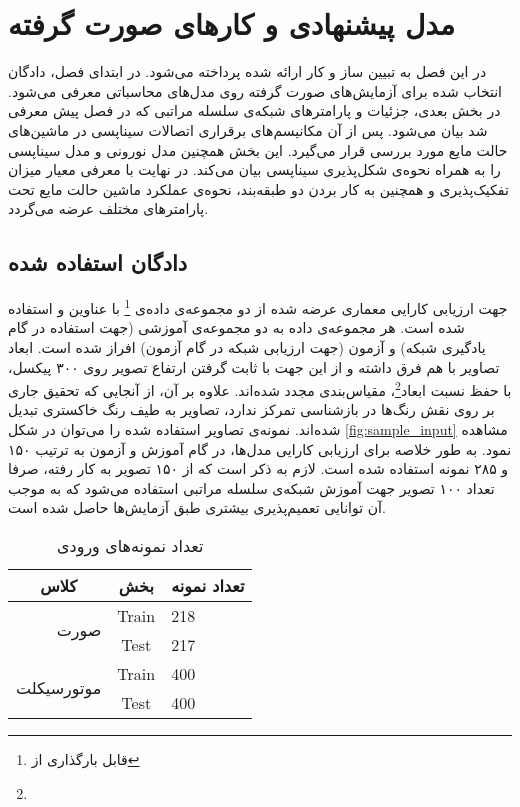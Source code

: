 \chapter{مدل پیشنهادی و کار‌های صورت گرفته}
در این فصل به تبیین ساز و کار ارائه شده پرداخته می‌شود. در ابتدای فصل، دادگان انتخاب شده برای آزمایش‌های صورت گرفته روی مدل‌های محاسباتی معرفی می‌شود. در بخش بعدی، جزئیات و پارامترهای شبکه‌ی سلسله مراتبی که در فصل پیش معرفی شد بیان می‌شود. پس از آن مکانیسم‌های برقراری اتصالات سیناپسی در ماشین‌های حالت مایع مورد بررسی قرار می‌گیرد. این بخش همچنین مدل نورونی و مدل سیناپسی را به همراه نحوه‌ی شکل‌پذیری سیناپسی بیان می‌کند. در نهایت با معرفی معیار میزان تفکیک‌پذیری و همچنین به کار بردن دو طبقه‌بند، نحوه‌ی عملکرد ماشین حالت مایع تحت پارامترهای مختلف عرضه می‌گردد.
\section{دادگان استفاده شده}
جهت ارزیابی کارایی معماری عرضه شده از دو مجموعه‌ی داده‌ی \footnote{قابل بارگذاری از } با عناوین  و  استفاده شده است. هر مجموعه‌ی داده به دو مجموعه‌ی آموزشی (جهت استفاده در گام یادگیری شبکه) و آزمون (جهت ارزیابی شبکه در گام آزمون) افراز شده است. ابعاد تصاویر با هم فرق داشته و از این جهت با ثابت گرفتن ارتفاع تصویر روی ۳۰۰ پیکسل، با حفظ نسبت ابعاد\footnote{}، مقیاس‌بندی مجدد شده‌اند. علاوه بر آن، از آنجایی که تحقیق جاری بر روی نقش رنگ‌ها در بازشناسی تمرکز ندارد، تصاویر به طیف رنگ خاکستری تبدیل شده‌اند. نمونه‌ی تصاویر استفاده شده را می‌توان در شکل \ref{fig:sample_input} مشاهده نمود. به طور خلاصه برای ارزیابی کارایی مدل‌ها، در گام آموزش و آزمون به ترتیب ۱۵۰ و ۲۸۵ نمونه استفاده شده است. لازم به ذکر است که از ۱۵۰ تصویر به کار رفته، صرفا تعداد ۱۰۰ تصویر جهت آموزش شبکه‌ی سلسله مراتبی استفاده می‌شود که به موجب آن توانایی تعمیم‌پذیری بیشتری طبق آزمایش‌ها حاصل شده است.


\begin{table}[]
\centering
\caption{تعداد نمونه‌های ورودی}
\label{my-label}
\begin{tabular}{|r|c|l|}
\hline
\multicolumn{1}{|c|}{کلاس} & بخش & \multicolumn{1}{c|}{تعداد نمونه} \\ \hline
\multirow{2}{*}{صورت}       & Train    & 218                                \\ \cline{2-3}  & Test     & 217                                \\ \hline
\multirow{2}{*}{موتورسیکلت} & Train    & 400                                \\ \cline{2-3} & Test     & 400                                \\ \hline
\end{tabular}
\end{table}

